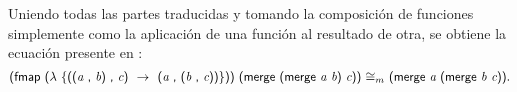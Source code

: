 Uniendo todas las partes traducidas y tomando la composición de funciones simplemente como la aplicación de una función al resultado de otra, se obtiene la ecuación presente en :
\begin{equation*}
\AgdaSymbol{(}\AgdaField{fmap} \ \AgdaSymbol{($\lambda \ \{$((}\AgdaBound{a} \ \AgdaInductiveConstructor{,} \ \AgdaBound{b}\AgdaSymbol{)} \ \AgdaInductiveConstructor{,} \ \AgdaBound{c}\AgdaSymbol{) \ $\rightarrow$ \ (}\AgdaBound{a} \ \AgdaInductiveConstructor{,} \ \AgdaSymbol{(}\AgdaBound{b} \ \AgdaInductiveConstructor{,} \ \AgdaBound{c}\AgdaSymbol{))\}))} \ \AgdaSymbol{(}\AgdaField{merge} \ \AgdaSymbol{(}\AgdaField{merge} \ \AgdaBound{a b}\AgdaSymbol{)} \  \AgdaBound{c}\AgdaSymbol{))} \ \AgdaField{$\cong_m$} \ \AgdaSymbol{(}\AgdaField{merge} \ \AgdaBound{a} \ \AgdaSymbol{(}\AgdaField{merge} \ \AgdaBound{b c}\AgdaSymbol{))}.
\end{equation*}